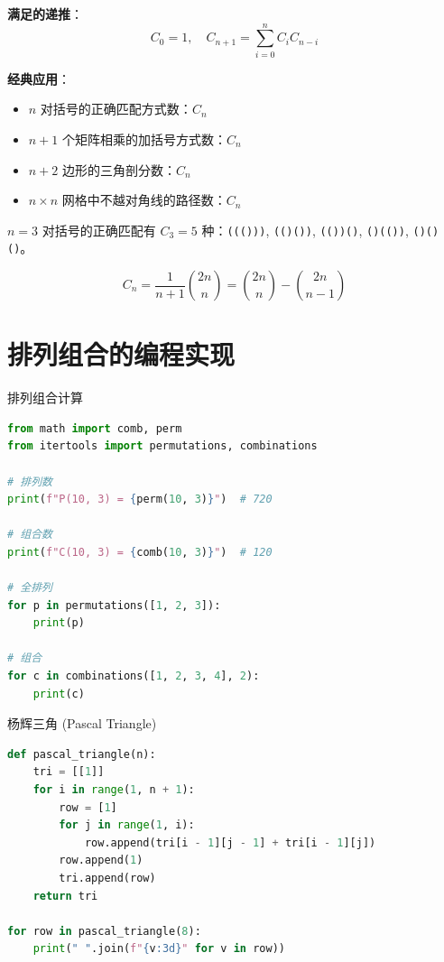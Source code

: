 \textbf{满足的递推}：
\[
C_0 = 1,\quad C_{n+1} = \sum_{i=0}^{n} C_i C_{n-i}
\]

\textbf{经典应用}：
\begin{itemize}
    \item $n$ 对括号的正确匹配方式数：$C_n$
    \item $n+1$ 个矩阵相乘的加括号方式数：$C_n$
    \item $n+2$ 边形的三角剖分数：$C_n$
    \item $n \times n$ 网格中不越对角线的路径数：$C_n$
\end{itemize}

\begin{example}
$n=3$ 对括号的正确匹配有 $C_3 = 5$ 种：\texttt{((()))}, \texttt{(()())}, \texttt{(())()}, \texttt{()(())}, \texttt{()()()}。
\end{example}

\begin{myformula}
\[
\boxed{C_n = \frac{1}{n+1}\binom{2n}{n} = \binom{2n}{n} - \binom{2n}{n-1}}
\]
\end{myformula}

\section{排列组合的编程实现}

\begin{mycode}{排列组合计算}
\begin{lstlisting}[language=Python]
from math import comb, perm
from itertools import permutations, combinations

# 排列数
print(f"P(10, 3) = {perm(10, 3)}")  # 720

# 组合数
print(f"C(10, 3) = {comb(10, 3)}")  # 120

# 全排列
for p in permutations([1, 2, 3]):
    print(p)

# 组合
for c in combinations([1, 2, 3, 4], 2):
    print(c)
\end{lstlisting}
\end{mycode}

\begin{mycode}{杨辉三角 (Pascal Triangle)}
\begin{lstlisting}[language=Python]
def pascal_triangle(n):
    tri = [[1]]
    for i in range(1, n + 1):
        row = [1]
        for j in range(1, i):
            row.append(tri[i - 1][j - 1] + tri[i - 1][j])
        row.append(1)
        tri.append(row)
    return tri

for row in pascal_triangle(8):
    print(" ".join(f"{v:3d}" for v in row))
\end{lstlisting}
\end{mycode}

